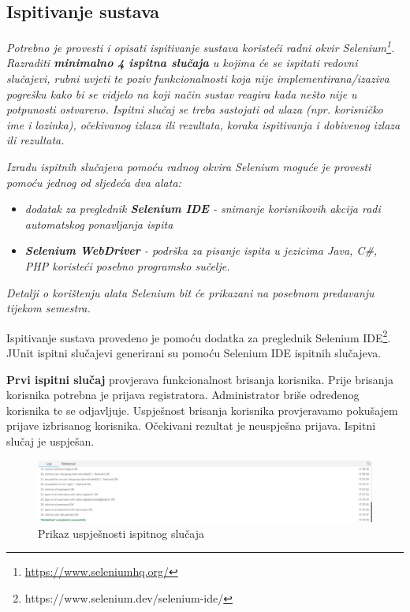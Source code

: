 			\subsection{Ispitivanje sustava}
			
			 \textit{Potrebno je provesti i opisati ispitivanje sustava koristeći radni okvir Selenium\footnote{\url{https://www.seleniumhq.org/}}. Razraditi \textbf{minimalno 4 ispitna slučaja} u kojima će se ispitati redovni slučajevi, rubni uvjeti te poziv funkcionalnosti koja nije implementirana/izaziva pogrešku kako bi se vidjelo na koji način sustav reagira kada nešto nije u potpunosti ostvareno. Ispitni slučaj se treba sastojati od ulaza (npr. korisničko ime i lozinka), očekivanog izlaza ili rezultata, koraka ispitivanja i dobivenog izlaza ili rezultata.\\ }
			 
			 \textit{Izradu ispitnih slučajeva pomoću radnog okvira Selenium moguće je provesti pomoću jednog od sljedeća dva alata:}
			 \begin{itemize}
			 	\item \textit{dodatak za preglednik \textbf{Selenium IDE} - snimanje korisnikovih akcija radi automatskog ponavljanja ispita	}
			 	\item \textit{\textbf{Selenium WebDriver} - podrška za pisanje ispita u jezicima Java, C\#, PHP koristeći posebno programsko sučelje.}
			 \end{itemize}
		 	\textit{Detalji o korištenju alata Selenium bit će prikazani na posebnom predavanju tijekom semestra.}
		 	
		 	Ispitivanje sustava provedeno je pomoću dodatka za preglednik Selenium IDE\footnote{https://www.selenium.dev/selenium-ide/}. JUnit ispitni slučajevi generirani su pomoću Selenium IDE ispitnih slučajeva.
		 	
		 	\textbf{Prvi ispitni slučaj} provjerava funkcionalnost brisanja korisnika. Prije brisanja korisnika potrebna je prijava registratora. Administrator briše određenog korisnika te se odjavljuje. Uspješnost brisanja korisnika provjeravamo pokušajem prijave izbrisanog korisnika. Očekivani rezultat je neuspješna prijava. Ispitni slučaj je uspješan.
		 	
		 	\begin{figure} [hbt!]
		 		\includegraphics[width=\linewidth]{Slike/deleteUser}
		 		\caption{Prikaz uspješnosti ispitnog slučaja}
		 	\end{figure}
		 	
